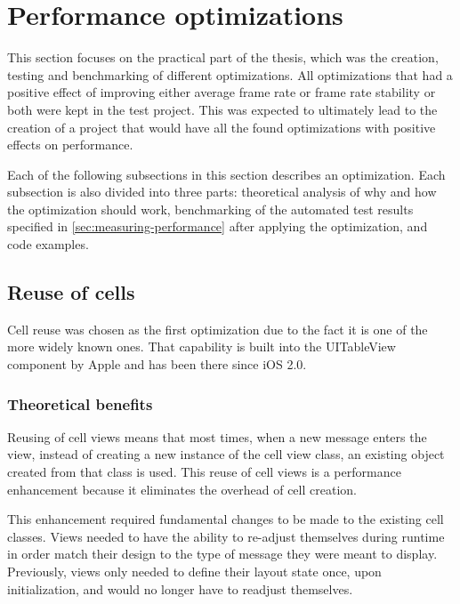 \documentclass[a4paper,12pt]{article}
\begin{document}
\section{Performance optimizations}
This section focuses on the practical part of the thesis, which was the creation, testing and benchmarking of different optimizations. All optimizations that had a positive effect of improving either average frame rate or frame rate stability or both were kept in the test project. This was expected to ultimately lead to the creation of a project that would have all the found optimizations with positive effects on performance.

Each of the following subsections in this section describes an optimization. Each subsection is also divided into three parts: theoretical analysis of why and how the optimization should work, benchmarking of the automated test results specified in \autoref{sec:measuring-performance} after applying the optimization, and code examples.

\subsection{Reuse of cells}
\label{subsec:reuse-of-cells}
Cell reuse was chosen as the first optimization due to the fact it is one of the more widely known ones. That capability is built into the UITableView component by Apple and has been there since iOS 2.0.\cite{HackingWithSwiftCellReuse}

\subsubsection{Theoretical benefits}
Reusing of cell views means that most times, when a new message enters the view, instead of creating a new instance of the cell view class, an existing object created from that class is used. This reuse of cell views is a performance enhancement because it eliminates the overhead of cell creation.\cite{AppleCharacteristicsOfCellObjects}

This enhancement required fundamental changes to be made to the existing cell classes. Views needed to have the ability to re-adjust themselves during runtime in order match their design to the type of message they were meant to display. Previously, views only needed to define their layout state once, upon initialization, and would no longer have to readjust themselves.
\end{document}
